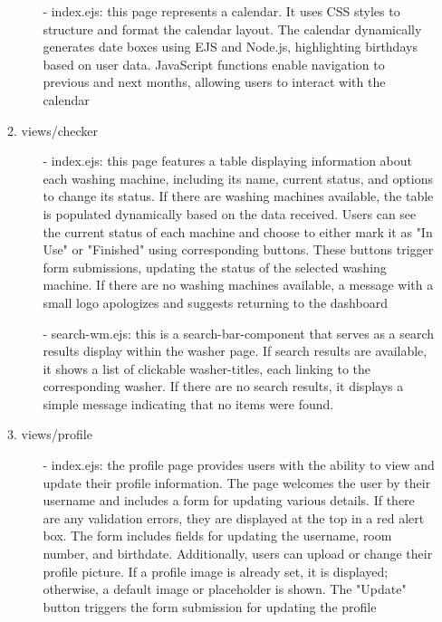 \documentclass[conference]{IEEEtran}
\begin{document}
\begin{enumerate}
\begin{enumerate}
\begin{itemize}
                    \item[-] index.ejs: this page represents a calendar. It uses CSS styles to structure and format the calendar layout. The calendar dynamically generates date boxes using EJS and Node.js, highlighting birthdays based on user data. JavaScript functions enable navigation to previous and next months, allowing users to interact with the calendar
                \end{itemize}
            \item views/checker
                \begin{itemize}
                    \item[-] index.ejs: this page features a table displaying information about each washing machine, including its name, current status, and options to change its status. If there are washing machines available, the table is populated dynamically based on the data received. Users can see the current status of each machine and choose to either mark it as "In Use" or "Finished" using corresponding buttons. These buttons trigger form submissions, updating the status of the selected washing machine. If there are no washing machines available, a message with a small logo apologizes and suggests returning to the dashboard
                    \item[-] search-wm.ejs: this is a search-bar-component that serves as a search results display within the washer page. If search results are available, it shows a list of clickable washer-titles, each linking to the corresponding washer. If there are no search results, it displays a simple message indicating that no items were found.
                \end{itemize}
            \item views/profile
                \begin{itemize}
                    \item[-] index.ejs: the profile page provides users with the ability to view and update their profile information. The page welcomes the user by their username and includes a form for updating various details. If there are any validation errors, they are displayed at the top in a red alert box. The form includes fields for updating the username, room number, and birthdate. Additionally, users can upload or change their profile picture. If a profile image is already set, it is displayed; otherwise, a default image or placeholder is shown. The "Update" button triggers the form submission for updating the profile
                \end{itemize}

\end{enumerate}
\end{enumerate}
\end{document}
